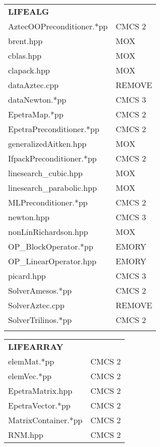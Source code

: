 \documentclass[10p]{article}
\theoremstyle{definition}
\begin{document}
\begin{landscape}
\begin{table}[!h]
\fontsize{7}{7}\selectfont
\begin{multicols}{4}
\begin{xtabular}{
p{0.20\textwidth}<{}|
p{0.10\textwidth}<{}
}
\textbf{LIFEALG} \\
AztecOOPreconditioner.*pp & CMCS 2\\
brent.hpp & MOX\\
cblas.hpp & MOX\\
clapack.hpp & MOX\\
dataAztec.cpp & REMOVE\\
dataNewton.*pp & CMCS 3\\
EpetraMap.*pp & CMCS 2\\
EpetraPreconditioner.*pp & CMCS 2\\
generalizedAitken.hpp & MOX\\
IfpackPreconditioner.*pp & CMCS 2\\
linesearch\_cubic.hpp & MOX\\
linesearch\_parabolic.hpp & MOX\\
MLPreconditioner.*pp & CMCS 2\\
newton.hpp & CMCS 3\\
nonLinRichardson.hpp & MOX\\
OP\_BlockOperator.*pp & EMORY\\
OP\_LinearOperator.hpp & EMORY\\
picard.hpp & CMCS 3\\
SolverAmesos.*pp & CMCS 2\\
SolverAztec.cpp & REMOVE\\
SolverTrilinos.*pp & CMCS 2\\
& \\
\end{xtabular}
\begin{xtabular}{
p{0.20\textwidth}<{}|
p{0.10\textwidth}<{}
}
\textbf{LIFEARRAY} \\
elemMat.*pp & CMCS 2\\
elemVec.*pp & CMCS 2\\
EpetraMatrix.hpp & CMCS 2\\
EpetraVector.*pp & CMCS 2\\
MatrixContainer.*pp & CMCS 2\\
RNM.hpp & CMCS 2\\

\end{xtabular}
\end{multicols}
\end{table}
\end{landscape}
\end{document}

